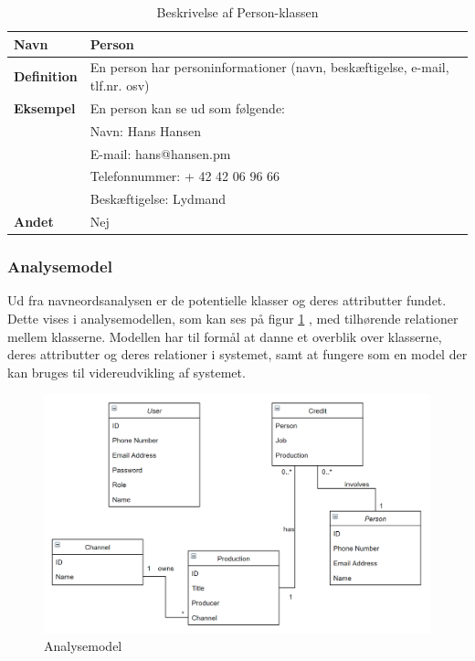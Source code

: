 \begin{table}[H]
    \begin{tabularx}{\textwidth}{|p{3cm}|X|}
        \hline
        \textbf{Navn} &  Person\\
        \hline
        \textbf{Definition} &  En person har personinformationer (navn, beskæftigelse, e-mail, tlf.nr. osv)\\
        \hline
        \textbf{Eksempel} & En person kan se ud som følgende: \\
                          & Navn: Hans Hansen\\
                          & E-mail: hans@hansen.pm\\
                          & Telefonnummer: + 42 42 06 96 66\\
                          & Beskæftigelse: Lydmand\\
        \hline
        \textbf{Andet} & Nej\\
        \hline
    \end{tabularx}
    \caption{Beskrivelse af Person-klassen}
    \label{tab:person_class_description}
\end{table}

\subsubsection{Analysemodel}
Ud fra navneordsanalysen er de potentielle klasser og deres attributter fundet. Dette vises i analysemodellen, som kan ses på figur \ref{fig:analysemodel} , med tilhørende relationer mellem klasserne. Modellen har til formål at danne et overblik over klasserne, deres attributter og deres relationer i systemet, samt at fungere som en model der kan bruges til videreudvikling af systemet. \\


\begin{figure}[h]
\centering
\includegraphics[scale=0.43]{figures/analysemodel.png}
\caption{Analysemodel}
\label{fig:analysemodel}
\end{figure}
